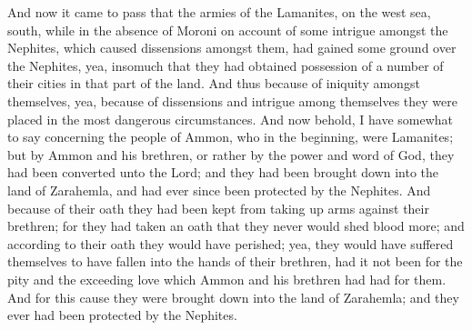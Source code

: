 And now it came to pass that the armies of the Lamanites, on the west sea, south, while in the absence of Moroni on account of some intrigue amongst the Nephites, which caused dissensions amongst them, had gained some ground over the Nephites, yea, insomuch that they had obtained possession of a number of their cities in that part of the land.
\bverse \iffalse And thus because of iniquity amongst themselves, yea, because of dissensions and intrigue among themselves they were placed in the most dangerous circumstances. \fi
And thus because of iniquity amongst themselves, yea, because of dissensions and intrigue among themselves they were placed in the most dangerous circumstances.
\bverse \iffalse And now behold, I have somewhat to say concerning the people of Ammon, who in the beginning, were Lamanites; but by Ammon and his brethren, or rather by the power and word of God, they had been converted unto the Lord; and they had been brought down into the land of Zarahemla, and had ever since been protected by the Nephites. \fi
And now behold, I have somewhat to say concerning the people of Ammon, who in the beginning, were Lamanites; but by Ammon and his brethren, or rather by the power and word of God, they had been converted unto the Lord; and they had been brought down into the land of Zarahemla, and had ever since been protected by the Nephites.
\bverse \iffalse And because of their oath they had been kept from taking up arms against their brethren; for they had taken an oath that they never would shed blood more; and according to their oath they would have perished; yea, they would have suffered themselves to have fallen into the hands of their brethren, had it not been for the pity and the exceeding love which Ammon and his brethren had had for them. \fi
And because of their oath they had been kept from taking up arms against their brethren; for they had taken an oath that they never would shed blood more; and according to their oath they would have perished; yea, they would have suffered themselves to have fallen into the hands of their brethren, had it not been for the pity and the exceeding love which Ammon and his brethren had had for them.
\bverse \iffalse And for this cause they were brought down into the land of Zarahemla; and they ever had been protected by the Nephites. \fi
And for this cause they were brought down into the land of Zarahemla; and they ever had been protected by the Nephites.
\bverse \iffalse But it came to pass that when they saw the danger, and the many afflictions and tribulations which the Nephites bore for them, they were moved with compassion and were desirous to take up arms in the defence of their country. \fi
